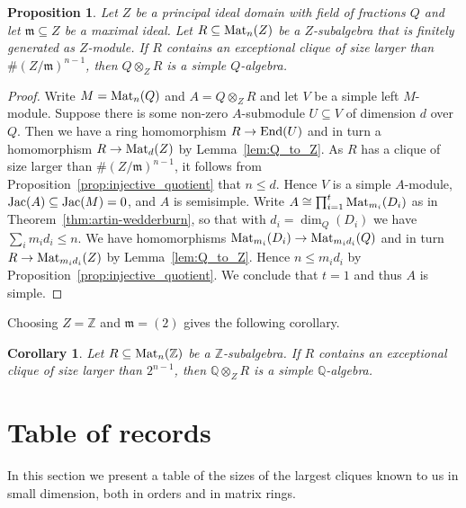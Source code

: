 \documentclass{amsart}
\theoremstyle{plain}
\newtheorem{proposition}[theorem]{Proposition}
\newtheorem{corollary}[theorem]{Corollary}
\theoremstyle{definition}
\newcommand{\tensor}{\otimes}
\newcommand{\Z}{\ensuremath{\mathbb{Z}}}
\newcommand{\Q}{\ensuremath{\mathbb{Q}}}
\newcommand{\m}{\ensuremath{\mathfrak{m}}}
\newcommand{\nrg}{R}
\begin{document}
\begin{proposition}\label{prop:clique_implies_simple}
	Let \(Z\) be a principal ideal domain with field of fractions \(Q\) and let \(\m\subseteq Z\) be a maximal ideal.
	Let \(\nrg\subseteq\textup{Mat}_n(Z)\) be a \(Z\)-subalgebra that is finitely generated as \(Z\)-module. 
	If \(\nrg\) contains an exceptional clique of size larger than \(\#(Z/\m)^{n-1}\), then \(Q\tensor_Z \nrg\) is a simple \(Q\)-algebra.
\end{proposition}
\begin{proof}
	Write \(M=\textup{Mat}_n(Q)\) and \(A=Q\tensor_Z \nrg\) and let \(V\) be a simple left \(M\)-module.
	Suppose there is some non-zero \(A\)-submodule \(U \subseteq V\) of dimension \(d\) over \(Q\).
	Then we have a ring homomorphism \(\nrg\to\textup{End}(U)\) and in turn a homomorphism \(\nrg\to\textup{Mat}_d(Z)\) by Lemma~\ref{lem:Q_to_Z}.
	As \(\nrg\) has a clique of size larger than \(\#(Z/\m)^{n-1}\), it follows from Proposition~\ref{prop:injective_quotient} that \(n\leq d\).
	Hence \(V\) is a simple \(A\)-module, \(\textup{Jac}(A)\subseteq\textup{Jac}(M)=0\), and \(A\) is semisimple. 
	Write \(A\cong \prod_{i=1}^t \textup{Mat}_{m_i}(D_i)\) as in Theorem~\ref{thm:artin-wedderburn}, so that with \(d_i=\dim_Q(D_i)\) we have \(\sum_{i} m_i d_i \leq n\).
	We have homomorphisms \(\textup{Mat}_{m_i}(D_i)\to\textup{Mat}_{m_i d_i}(Q)\) and in turn \(\nrg\to\textup{Mat}_{m_id_i}(Z)\) by Lemma~\ref{lem:Q_to_Z}.
	Hence \(n\leq m_id_i\) by Proposition~\ref{prop:injective_quotient}.
	We conclude that \(t=1\) and thus \(A\) is simple.
\end{proof}

Choosing $Z=\Z$ and $\m=(2)$ gives the following corollary.

\begin{corollary}
	Let $\nrg\subseteq\textup{Mat}_n(\Z)$ be a $\Z$-subalgebra. If $\nrg$ contains an exceptional clique of size larger than $2^{n-1}$, then $\Q\tensor_Z\nrg$ is a simple $\Q$-algebra.
\end{corollary}


\section{Table of records}\label{sec:table_of_records}

In this section we present a table of the sizes of the largest cliques known to us in small dimension, both in orders and in matrix rings. \\
\end{document}
